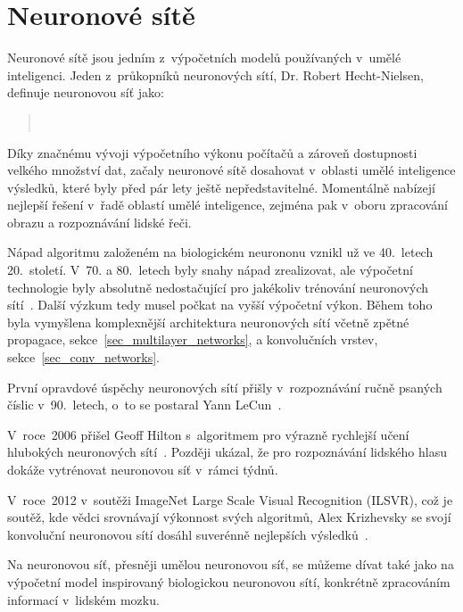 
\section{Neuronové sítě}
\label{sec_neural_networks}

Neuronové sítě jsou jedním z~výpočetních modelů používaných v~umělé inteligenci. Jeden z~průkopníků neuronových sítí, Dr. Robert Hecht-Nielsen, definuje neuronovou síť jako:

\begin{quote}
    ~\cite{tdsNeuralNetworks}
\end{quote}

Díky značnému vývoji výpočetního výkonu počítačů a zároveň dostupnosti velkého množství dat, začaly neuronové sítě dosahovat v~oblasti umělé inteligence výsledků, které byly před pár lety ještě nepředstavitelné. Momentálně nabízejí nejlepší řešení v~řadě oblastí umělé inteligence, zejména pak v~oboru zpracování obrazu a rozpoznávání lidské řeči.

Nápad algoritmu založeném na biologickém neurononu vznikl už ve 40.~letech 20.~století. V~70. a 80.~letech byly snahy nápad zrealizovat, ale výpočetní technologie byly absolutně nedostačující pro jakékoliv trénování neuronových sítí~\cite{wikiNeuralNework}. Další výzkum tedy musel počkat na vyšší výpočetní výkon. Během toho byla vymyšlena komplexnější architektura neuronových sítí včetně zpětné propagace, sekce~\ref{sec_multilayer_networks}, a konvolučních vrstev, sekce~\ref{sec_conv_networks}.

První opravdové úspěchy neuronových sítí přišly v~rozpoznávání ručně psaných číslic v~90.~letech, o~to se postaral Yann LeCun~\cite{paperYannLeCun}.

V~roce~2006 přišel Geoff Hilton s~algoritmem pro výrazně rychlejší učení hlubokých neuronových sítí~\cite{paperHilton}. Později ukázal, že pro rozpoznávání lidského hlasu dokáže vytrénovat neuronovou síť v~rámci týdnů.

V~roce~2012 v~soutěži ImageNet Large Scale Visual Recognition (ILSVR), což je soutěž, kde vědci srovnávají výkonnost svých algoritmů, Alex Krizhevsky se svojí konvoluční neuronovou sítí dosáhl suverénně nejlepších výsledků~\cite{paperKriz}.

Na neuronovou síť, přesněji umělou neuronovou síť, se můžeme dívat také jako na výpočetní model inspirovaný biologickou neuronovou sítí, konkrétně zpracováním informací v~lidském mozku.

